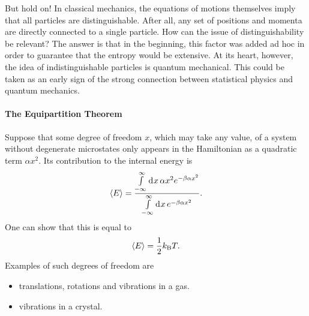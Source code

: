 But hold on! In classical mechanics, the equations of motions themselves imply that all particles are distinguishable. After all, any set of positions and momenta are directly connected to a single particle. How can the issue of distinguishability be relevant? The answer is that in the beginning, this factor was added ad hoc in order to guarantee that the entropy would be extensive. At its heart, however, the idea of indistinguishable particles is quantum mechanical. This could be taken as an early sign of the strong connection between statistical physics and quantum mechanics.

\paragraph{The Equipartition Theorem}
Suppose that some degree of freedom $x$, which may take any value, of a system without degenerate microstates only appears in the Hamiltonian as a quadratic term $\alpha x^{2}$. Its contribution to the internal energy is
\begin{align*}
\expval{E} = \frac{\int\limits_{-\infty}^{\infty}\dd[]{x}\alpha x^{2}e^{-\beta\alpha x^{2}}}{\int\limits_{-\infty}^{\infty}\dd[]{x}e^{-\beta\alpha x^{2}}}.
\end{align*}
One can show that this is equal to
\begin{align*}
\expval{E} = \frac{1}{2}k_{\text{B}} T.
\end{align*}
Examples of such degrees of freedom are
\begin{itemize}
	\item translations, rotations and vibrations in a gas.
	\item vibrations in a crystal.
\end{itemize}

